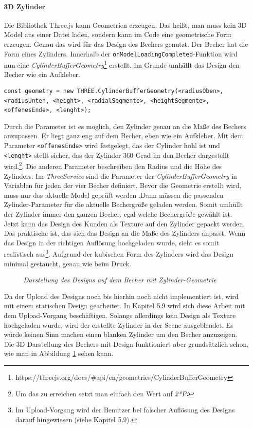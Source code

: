 \paragraph{3D Zylinder}
Die Bibliothek Three.js kann Geometrien erzeugen. Das heißt, man muss kein 3D Model aus einer Datei laden, sondern kann im Code eine geometrische Form erzeugen. Genau das wird für das Design des Bechers genutzt. Der Becher hat die Form eines Zylinders. Innerhalb der \texttt{onModelLoadingCompleted}-Funktion wird nun eine \textit{CylinderBufferGeometry}\footnote{https://threejs.org/docs/\#api/en/geometries/CylinderBufferGeometry} erstellt. Im Grunde umhüllt das Design den Becher wie ein Aufkleber.
%
\begin{lstlisting}[caption={Erstellung der Zylinder-Geometrie mittels Three.js},label=lst:cylinderbuffergeometry]
const geometry = new THREE.CylinderBufferGeometry(<radiusOben>, <radiusUnten, <height>, <radialSegmente>, <heightSegmente>, <offenesEnde>, <lenght>);
\end{lstlisting}
%
Durch die Parameter ist es möglich, den Zylinder genau an die Maße des Bechers anzupassen. Er liegt ganz eng auf dem Becher, eben wie ein Aufkleber. Mit dem Parameter \texttt{<offenesEnde>} wird festgelegt, das der Cylinder hohl ist und \texttt{<lenght>} stellt sicher, das der Zylinder 360 Grad im den Becher dargestellt wird.\footnote{Um das zu erreichen setzt man einfach den Wert auf \textit{2*Pi }}. Die anderen Parameter beschreiben den Radius und die Höhe des Zylinders. Im \textit{ThreeService} sind die Parameter der \textit{CylinderBufferGeometry} in Variablen für jeden der vier Becher definiert. Bevor die Geometrie erstellt wird, muss nur das aktuelle Model geprüft werden .Dann müssen die passenden Zylinder-Parameter für die aktuelle Bechergröße geladen werden. Somit umhüllt der Zylinder immer den ganzen Becher, egal welche Bechergröße gewählt ist.\\
Jetzt kann das Design des Kunden als Texture auf den Zylinder gepackt werden. Das praktische ist, das sich das Design an die Maße des Zylinders anpasst. Wenn das Design in der richtigen Auflösung hochgeladen wurde, sieht es somit realistisch aus\footnote{Im Upload-Vorgang wird der Benutzer bei falscher Auflösung des Designs darauf hingewiesen (siehe Kapitel 5.9).}. Aufgrund der kubischen Form des Zylinders wird das Design minimal gestaucht, genau wie beim Druck.
\begin{figure}[h]
	\centering
	{}
	\caption[Konfigurator mit designtem Becher]{\textit{Darstellung des Designs auf dem Becher mit Zylinder-Geometrie}}
	\label{fig:bechermitdesign}
\end{figure}
Da der Upload des Designs noch bis hierhin noch nicht implementiert ist, wird mit einem statischen Design gearbeitet. In Kapitel 5.9 wird sich diese Arbeit mit dem Upload-Vorgang beschäftigen. Solange allerdings kein Design als Texture hochgeladen wurde, wird der erstellte Zylinder in der Scene ausgeblendet. Es würde keinen Sinn machen einen blanken Zylinder um den Becher anzuzeigen. Die 3D Darstellung des Bechers mit Design funktioniert aber grundsätzlich schon, wie man in Abbildung \ref{fig:bechermitdesign} sehen kann.
%
